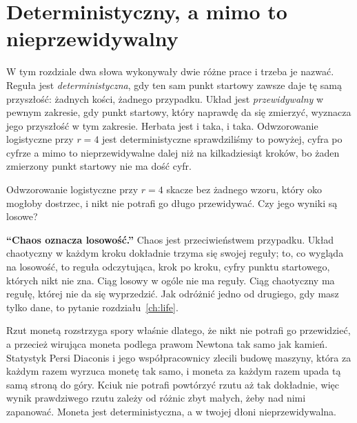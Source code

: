 \section{Deterministyczny, a mimo to nieprzewidywalny}
\label{sec:ch06-determinism}

\noindent
W tym rozdziale dwa słowa wykonywały dwie różne prace i trzeba je nazwać.
Reguła jest \emph{deterministyczna}, gdy ten sam punkt startowy zawsze daje
tę samą przyszłość: żadnych kości, żadnego przypadku. Układ jest
\emph{przewidywalny} w pewnym zakresie, gdy punkt startowy, który naprawdę
da się zmierzyć, wyznacza jego przyszłość w tym zakresie. Herbata jest i
taka, i taka. Odwzorowanie logistyczne przy $r = 4$ jest deterministyczne
\dash{} sprawdziliśmy to powyżej, cyfra po cyfrze \dash{} a mimo to
nieprzewidywalne dalej niż na kilkadziesiąt kroków, bo żaden zmierzony punkt
startowy nie ma dość cyfr.

\begin{think}
Odwzorowanie logistyczne przy $r = 4$ skacze bez żadnego wzoru, który oko
mogłoby dostrzec, i nikt nie potrafi go długo przewidywać. Czy jego wyniki
są losowe?
\end{think}

\begin{trapbox}
\textbf{\enquote{Chaos oznacza losowość.}} Chaos jest przeciwieństwem
przypadku. Układ chaotyczny w każdym kroku dokładnie trzyma się swojej
reguły; to, co wygląda na losowość, to reguła odczytująca, krok po kroku,
cyfry punktu startowego, których nikt nie zna. Ciąg losowy w ogóle nie ma
reguły. Ciąg chaotyczny ma regułę, której nie da się wyprzedzić. Jak
odróżnić jedno od drugiego, gdy masz tylko dane, to pytanie
rozdziału~\ref{ch:life}.
\end{trapbox}

\begin{worldbox}
Rzut monetą rozstrzyga spory właśnie dlatego, że nikt nie potrafi go
przewidzieć, a przecież wirująca moneta podlega prawom Newtona tak samo jak
kamień. Statystyk Persi Diaconis i jego współpracownicy zlecili budowę
maszyny, która za każdym razem wyrzuca monetę tak samo, i moneta za każdym
razem upada tą samą stroną do góry. Kciuk nie potrafi powtórzyć rzutu aż
tak dokładnie, więc wynik prawdziwego rzutu zależy od różnic zbyt małych,
żeby nad nimi zapanować. Moneta jest deterministyczna, a w twojej dłoni
\dash{} nieprzewidywalna.
\end{worldbox}

